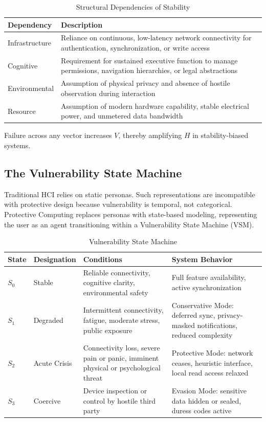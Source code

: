 \documentclass[acmsmall,review]{acmart}
\begin{document}
\begin{table}[h]
\centering
\caption{Structural Dependencies of Stability}
\label{tab:dependencies}
\begin{tabular}{ll}
\toprule
\textbf{Dependency} & \textbf{Description} \\
\midrule
Infrastructure & Reliance on continuous, low-latency network connectivity for authentication, synchronization, or write access \\
Cognitive & Requirement for sustained executive function to manage permissions, navigation hierarchies, or legal abstractions \\
Environmental & Assumption of physical privacy and absence of hostile observation during interaction \\
Resource & Assumption of modern hardware capability, stable electrical power, and unmetered data bandwidth \\
\bottomrule
\end{tabular}
\end{table}

Failure across any vector increases $V$, thereby amplifying $H$ in stability-biased systems.

\subsection{The Vulnerability State Machine}

Traditional HCI relies on static personas. Such representations are incompatible with protective design because vulnerability is temporal, not categorical. Protective Computing replaces personas with state-based modeling, representing the user as an agent transitioning within a Vulnerability State Machine (VSM).

\begin{table}[h]
\centering
\caption{Vulnerability State Machine}
\label{tab:vsm}
\begin{tabular}{llll}
\toprule
\textbf{State} & \textbf{Designation} & \textbf{Conditions} & \textbf{System Behavior} \\
\midrule
$S_0$ & Stable & Reliable connectivity, cognitive clarity, environmental safety & Full feature availability, active synchronization \\
$S_1$ & Degraded & Intermittent connectivity, fatigue, moderate stress, public exposure & Conservative Mode: deferred sync, privacy-masked notifications, reduced complexity \\
$S_2$ & Acute Crisis & Connectivity loss, severe pain or panic, imminent physical or psychological threat & Protective Mode: network ceases, heuristic interface, local read access relaxed \\
$S_3$ & Coercive & Device inspection or control by hostile third party & Evasion Mode: sensitive data hidden or sealed, duress codes active \\
\bottomrule
\end{tabular}
\end{table}
\end{document}
